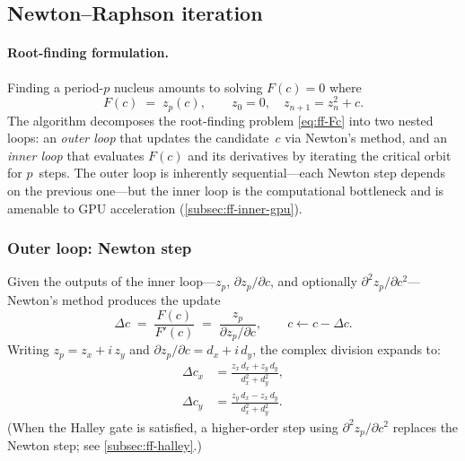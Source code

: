 \subsection{Newton--Raphson iteration}
\label{subsec:ff-newton}

\paragraph{Root-finding formulation.}
Finding a period-$p$ nucleus amounts to solving $F(c)=0$ where
\begin{equation}\label{eq:ff-Fc}
F(c) \;=\; z_p(c),\qquad
z_0 = 0,\quad z_{n+1} = z_n^2 + c.
\end{equation}
The algorithm decomposes the root-finding problem \eqref{eq:ff-Fc} into two nested loops: an \emph{outer loop} that
updates the candidate~$c$ via Newton's method, and an \emph{inner loop} that
evaluates $F(c)$ and its derivatives by iterating the critical orbit for
$p$~steps.  The outer loop is inherently sequential---each Newton step
depends on the previous one---but the inner loop is the computational
bottleneck and is amenable to GPU acceleration
(\cref{subsec:ff-inner-gpu}).

\subsubsection{Outer loop: Newton step}
\label{subsubsec:ff-outer}

Given the outputs of the inner loop---$z_p$, $\partial z_p/\partial c$, and
optionally $\partial^2 z_p/\partial c^2$---Newton's method produces the
update
\begin{equation}\label{eq:ff-newton-step}
\Delta c \;=\; \frac{F(c)}{F'(c)}
         \;=\; \frac{z_p}{\partial z_p / \partial c},
\qquad c \leftarrow c - \Delta c.
\end{equation}
Writing $z_p = z_x + i\,z_y$ and $\partial z_p/\partial c = d_x + i\,d_y$,
the complex division expands to:
\begin{align}
\Delta c_x &= \frac{z_x\,d_x + z_y\,d_y}{d_x^2 + d_y^2}, \\[4pt]
\Delta c_y &= \frac{z_y\,d_x - z_x\,d_y}{d_x^2 + d_y^2}.
\end{align}
(When the Halley gate is satisfied, a higher-order step using
$\partial^2 z_p/\partial c^2$ replaces the Newton step; see
\cref{subsec:ff-halley}.)

